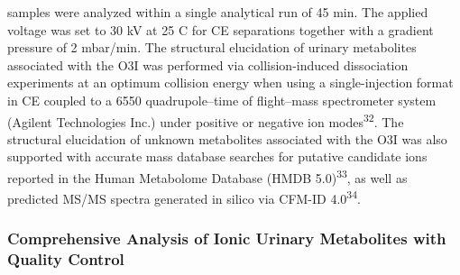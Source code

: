 \documentclass[journal=jacsat,manuscript=article]{achemso}
\begin{document}
samples were analyzed within a single analytical run of 45 min. The
applied voltage was set to 30 kV at 25 C for CE separations together
with a gradient pressure of 2 mbar/min. The structural elucidation of
urinary metabolites associated with the O3I was performed via
collision-induced dissociation experiments at an optimum collision
energy when using a single-injection format in CE coupled to a 6550
quadrupole--time of flight--mass spectrometer system (Agilent
Technologies Inc.) under positive or negative ion
modes\textsuperscript{32}. The structural elucidation of unknown
metabolites associated with the O3I was also supported with accurate
mass database searches for putative candidate ions reported in the Human
Metabolome Database (HMDB 5.0)\textsuperscript{33}, as well as predicted
MS/MS spectra generated in silico via CFM-ID 4.0\textsuperscript{34}.

\subsubsection{Comprehensive Analysis of Ionic Urinary Metabolites with
Quality
Control}\label{comprehensive-analysis-of-ionic-urinary-metabolites-with-quality-control}
\end{document}
